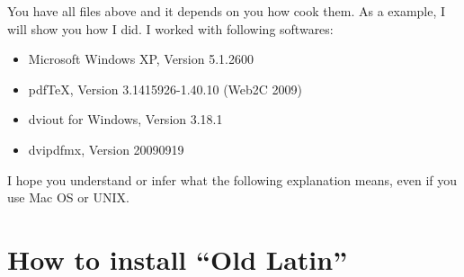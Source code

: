 \documentclass[a4paper]{article}
\begin{document}
You have all files above and it depends on you how cook them.
As a example, I will show you how I did.
I worked with following softwares:
\begin{itemize}
\item Microsoft Windows XP, Version 5.1.2600
\item pdfTeX, Version 3.1415926-1.40.10 (Web2C 2009)
\item dviout for Windows, Version 3.18.1
\item dvipdfmx, Version 20090919
\end{itemize}
I hope you understand or infer what the following explanation means,
even if you use Mac OS or UNIX.

\section{How to install ``Old Latin''}
\end{document}
